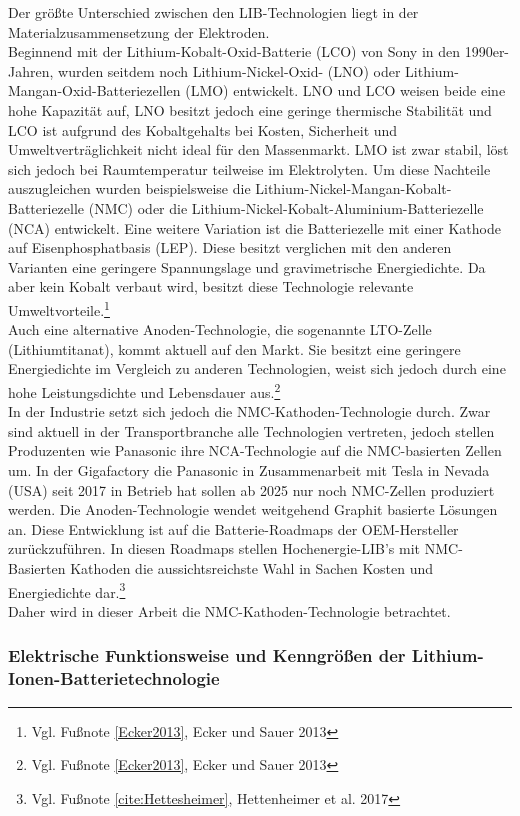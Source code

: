 Der größte Unterschied zwischen den LIB-Technologien liegt in der Materialzusammensetzung der Elektroden.\\
Beginnend mit der Lithium-Kobalt-Oxid-Batterie (LCO) von Sony in den 1990er-Jahren, wurden seitdem noch Lithium-Nickel-Oxid- (LNO) oder Lithium-Mangan-Oxid-Batteriezellen (LMO) entwickelt. LNO und LCO weisen beide eine hohe Kapazität auf, LNO besitzt jedoch eine geringe thermische Stabilität und LCO ist aufgrund des Kobaltgehalts bei Kosten, Sicherheit und Umweltverträglichkeit nicht ideal für den Massenmarkt. LMO ist zwar stabil, löst sich jedoch bei Raumtemperatur teilweise im Elektrolyten. Um diese Nachteile auszugleichen wurden beispielsweise die Lithium-Nickel-Mangan-Kobalt-Batteriezelle (NMC) oder die Lithium-Nickel-Kobalt-Aluminium-Batteriezelle (NCA) entwickelt. Eine weitere Variation ist die Batteriezelle mit einer Kathode auf Eisenphosphatbasis (LEP). Diese besitzt verglichen mit den anderen Varianten eine geringere Spannungslage und gravimetrische Energiedichte. Da aber kein Kobalt verbaut wird, besitzt diese Technologie relevante Umweltvorteile.\footnote{Vgl. Fußnote \ref{Ecker2013}, Ecker und Sauer 2013}\\
Auch eine alternative Anoden-Technologie, die sogenannte LTO-Zelle (Lithiumtitanat), kommt aktuell auf den Markt. Sie besitzt eine geringere Energiedichte im Vergleich zu anderen Technologien, weist sich jedoch durch eine hohe Leistungsdichte und Lebensdauer aus.\footnote{Vgl. Fußnote \ref{Ecker2013}, Ecker und Sauer 2013}  \\
In der Industrie setzt sich jedoch die NMC-Kathoden-Technologie durch. Zwar sind aktuell in der Transportbranche alle Technologien vertreten, jedoch stellen Produzenten wie Panasonic ihre NCA-Technologie auf die NMC-basierten Zellen um. In der Gigafactory die Panasonic in Zusammenarbeit mit Tesla in Nevada (USA) seit 2017 in Betrieb hat sollen ab 2025 nur noch NMC-Zellen produziert werden. Die Anoden-Technologie wendet weitgehend Graphit basierte Lösungen an. Diese Entwicklung ist auf die Batterie-Roadmaps der OEM-Hersteller zurückzuführen. In diesen Roadmaps stellen Hochenergie-LIB's mit NMC-Basierten Kathoden die aussichtsreichste Wahl in Sachen Kosten und Energiedichte dar.\footnote{Vgl. Fußnote \ref{cite:Hettesheimer}, Hettenheimer et al. 2017} \\
Daher wird in dieser Arbeit die NMC-Kathoden-Technologie betrachtet.%

\subsubsection*{Elektrische Funktionsweise und Kenngrößen der Lithium-Ionen-Batterietechnologie}\label{subsub:ElekChemFunktion}

